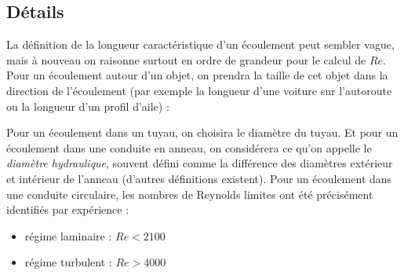 \subsection{Détails}\label{sec:Re_details}
La définition de la longueur caractéristique d'un écoulement peut sembler vague, mais à nouveau on raisonne surtout en ordre de grandeur pour le calcul de $Re$. Pour un écoulement autour d'un objet, on prendra la taille de cet objet dans la direction de l'écoulement (par exemple la longueur d'une voiture sur l'autoroute ou la longueur d'un profil d'aile) :
%
\begin{center}
\end{center}
%
Pour un écoulement dans un tuyau, on choisira le diamètre du tuyau. Et pour un écoulement dans une conduite en anneau, on considérera ce qu'on appelle le \textit{diamètre hydraulique}, souvent défini comme la différence des diamètres extérieur et intérieur de l'anneau (d'autres définitions existent).
%
Pour un écoulement dans une conduite circulaire, les nombres de Reynolds limites ont été précisément identifiés par expérience :
\begin{itemize}
    \item régime laminaire : $Re<2100$
    \item régime turbulent : $Re>4000$
\end{itemize}
